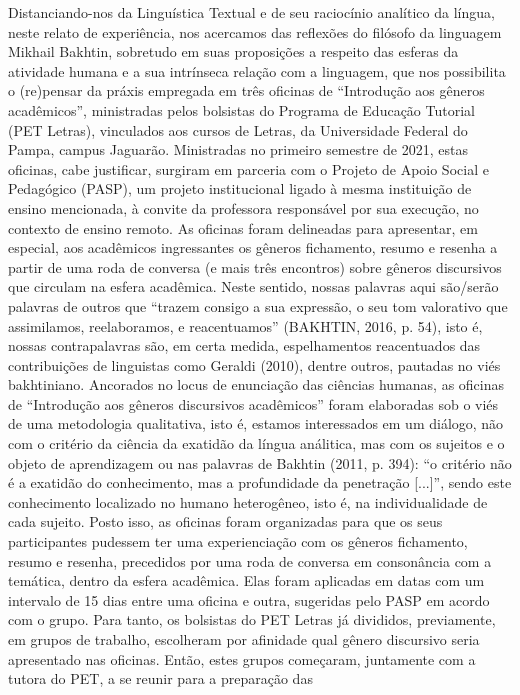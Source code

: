 Distanciando-nos da Linguística Textual e de seu raciocínio analítico da língua, neste
relato de experiência, nos acercamos das reflexões do filósofo da linguagem Mikhail Bakhtin,
sobretudo em suas proposições a respeito das esferas da atividade humana e a sua intrínseca
relação com a linguagem, que nos possibilita o (re)pensar da práxis empregada em três oficinas
de “Introdução aos gêneros acadêmicos”, ministradas pelos bolsistas do Programa de Educação
Tutorial (PET Letras), vinculados aos cursos de Letras, da Universidade Federal do Pampa,
campus Jaguarão. Ministradas no primeiro semestre de 2021, estas oficinas, cabe justificar,
surgiram em parceria com o Projeto de Apoio Social e Pedagógico (PASP), um projeto
institucional ligado à mesma instituição de ensino mencionada, à convite da professora
responsável por sua execução, no contexto de ensino remoto. As oficinas foram delineadas para
apresentar, em especial, aos acadêmicos ingressantes os gêneros fichamento, resumo e resenha a
partir de uma roda de conversa (e mais três encontros) sobre gêneros discursivos que circulam na
esfera acadêmica. Neste sentido, nossas palavras aqui são/serão palavras de outros que “trazem
consigo a sua expressão, o seu tom valorativo que assimilamos, reelaboramos, e reacentuamos”
(BAKHTIN, 2016, p. 54), isto é, nossas contrapalavras são, em certa medida, espelhamentos
reacentuados das contribuições de linguistas como Geraldi (2010), dentre outros, pautadas no
viés bakhtiniano.
Ancorados no locus de enunciação das ciências humanas, as oficinas de “Introdução aos
gêneros discursivos acadêmicos” foram elaboradas sob o viés de uma metodologia qualitativa,
isto é, estamos interessados em um diálogo, não com o critério da ciência da exatidão da língua
análitica, mas com os sujeitos e o objeto de aprendizagem ou nas palavras de Bakhtin (2011, p.
394): “o critério não é a exatidão do conhecimento, mas a profundidade da penetração [...]”,
sendo este conhecimento localizado no humano heterogêneo, isto é, na individualidade de cada
sujeito.
Posto isso, as oficinas foram organizadas para que os seus participantes pudessem ter
uma experienciação com os gêneros fichamento, resumo e resenha, precedidos por uma roda de
conversa em consonância com a temática, dentro da esfera acadêmica. Elas foram aplicadas em
datas com um intervalo de 15 dias entre uma oficina e outra, sugeridas pelo PASP em acordo
com o grupo. Para tanto, os bolsistas do PET Letras já divididos, previamente, em grupos de
trabalho, escolheram por afinidade qual gênero discursivo seria apresentado nas oficinas. Então,
estes grupos começaram, juntamente com a tutora do PET, a se reunir para a preparação das
